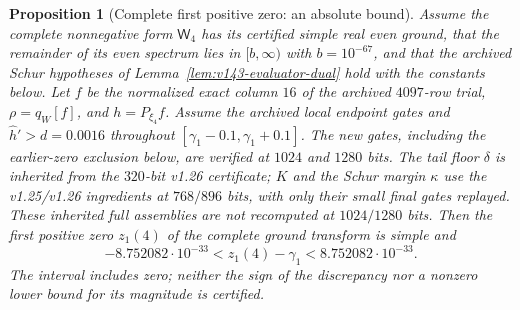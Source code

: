 \documentclass[11pt]{article}
\newtheorem{proposition}[theorem]{Proposition}
\theoremstyle{remark}
\begin{document}
\begin{proposition}[Complete first positive zero: an absolute bound]
\label{prop:v143-first-zero-bound}
Assume the complete nonnegative form $\mathsf W_4$ has its certified simple
real even ground, that the remainder of its even spectrum lies in
$[b,\infty)$ with $b=10^{-67}$, and that the archived Schur hypotheses
of Lemma~\ref{lem:v143-evaluator-dual} hold with the constants below.
Let $f$ be the normalized exact column $16$ of the archived $4097$-row
trial, $\rho=q_W[f]$, and $h=P_{\xi_4}f$. Assume the archived local
endpoint gates and $\widehat h'>d=0.0016$ throughout
$[\gamma_1-0.1,\gamma_1+0.1]$. The new gates, including the earlier-zero
exclusion below, are verified at $1024$ and $1280$ bits. The tail floor
$\delta$ is inherited from the $320$-bit v1.26 certificate; $K$ and the
Schur margin $\kappa$ use the v1.25/v1.26 ingredients at $768/896$ bits,
with only their small final gates replayed. These inherited full
assemblies are not recomputed at $1024/1280$ bits.
Then the first positive zero $z_1(4)$ of the complete ground transform
is simple and
\begin{equation}\label{eq:v143-first-zero-absolute}
 -8.752082\cdot10^{-33}<z_1(4)-\gamma_1<8.752082\cdot10^{-33}.
\end{equation}
The interval includes zero; neither the sign of the discrepancy nor
a nonzero lower bound for its magnitude is certified.
\end{proposition}
\end{document}
